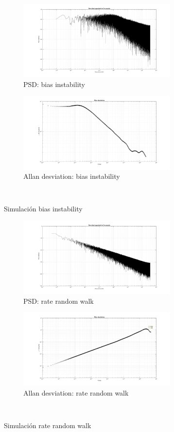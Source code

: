 \documentclass[a4paper,11pt,twoside]{IT-CNEA}
\begin{document}
\begin{figure}[t!]
    \centering
    \begin{subfigure}[t]{0.5\textwidth}
        \centering
        \includegraphics[width=8cm]{Figuras/PSDBI.png}
        \caption{PSD: bias instability}
        \label{fig:}
    \end{subfigure}%
    \begin{subfigure}[t]{0.5\textwidth}
        \centering
        \includegraphics[width=8cm]{Figuras/AllanBI.png}
        \caption{Allan desviation: bias instability}
        \label{fig:}
    \end{subfigure}%
    ~ 
    \caption{Simulación bias instability}
    \label{fig:simulacionBI}
\end{figure}
\begin{figure}[t!]
    \centering
    \begin{subfigure}[t]{0.5\textwidth}
        \centering
        \includegraphics[width=8cm]{Figuras/PSDRRW.png}
        \caption{PSD: rate random walk}
        \label{fig:}
    \end{subfigure}%
    \begin{subfigure}[t]{0.5\textwidth}
        \centering
        \includegraphics[width=8cm]{Figuras/AllanRRW.png}
        \caption{Allan desviation: rate random walk}
        \label{fig:}
    \end{subfigure}%
    ~ 
    \caption{Simulación rate random walk}
    \label{fig:simulacionRRW}
\end{figure}
\end{document}
